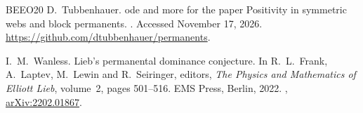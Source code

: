 \documentclass[a4paper,11pt]{amsart}
\numberwithin{equation}{subsection}
\theoremstyle{plain}
\theoremstyle{definition}
\begin{document}
\begin{thebibliography}{BEEO20}
D.~Tubbenhauer.
ode and more for the paper {P}ositivity in symmetric webs and block permanents.
. Accessed November 17, 2026.
\newblock \url{https://github.com/dtubbenhauer/permanents}.

I.~M.~Wanless.
\newblock Lieb's permanental dominance conjecture.
\newblock In R.~L.~Frank, A.~Laptev, M.~Lewin and R.~Seiringer, editors,
{\em The Physics and Mathematics of Elliott Lieb}, volume~2, pages 501--516.
EMS Press, Berlin, 2022.
\newblock \href{https://doi.org/10.4171/90-2/48}{},
\href{https://arxiv.org/abs/2202.01867}{arXiv:2202.01867}.

\end{thebibliography}
\end{document}
